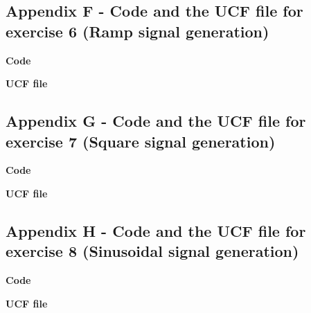 \pagebreak

\subsection*{Appendix F - Code and the UCF file for exercise 6 (Ramp signal generation)}
\textbf{Code}

\textbf{UCF file}


\pagebreak

\subsection*{Appendix G - Code and the UCF file for exercise 7 (Square signal generation)}
\textbf{Code}

\textbf{UCF file}


\pagebreak

\subsection*{Appendix H - Code and the UCF file for exercise 8 (Sinusoidal signal generation)}
\textbf{Code}

\textbf{UCF file}
